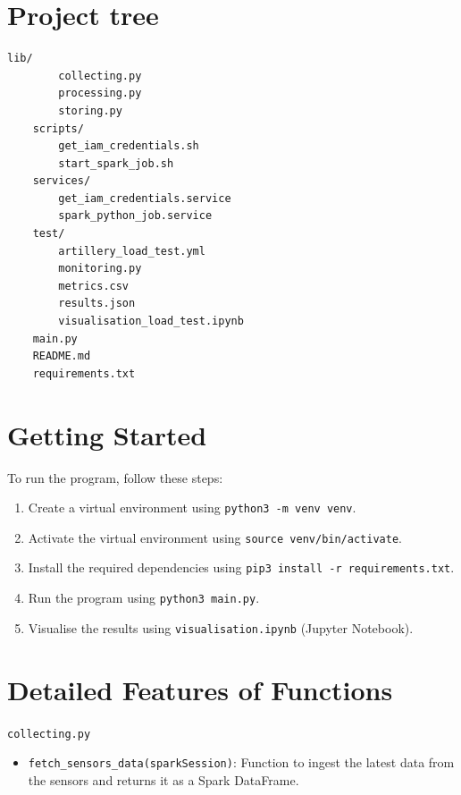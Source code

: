 \documentclass[12pt,oneside]{book} %
\begin{document}
\begin{subappendices}
    \section{Project tree}
    \begin{lstlisting}[breaklines=true, basicstyle=\small]
    lib/
        collecting.py
        processing.py
        storing.py
    scripts/
        get_iam_credentials.sh
        start_spark_job.sh
    services/
        get_iam_credentials.service
        spark_python_job.service
    test/
        artillery_load_test.yml
        monitoring.py
        metrics.csv
        results.json
        visualisation_load_test.ipynb
    main.py
    README.md
    requirements.txt
    \end{lstlisting}

    \section{Getting Started}
    To run the program, follow these steps:
    \begin{enumerate}
        \itemindent=17.87pt
        \item Create a virtual environment using \texttt{python3 -m venv venv}.
        \item Activate the virtual environment using \texttt{source venv/bin/activate}.
        \item Install the required dependencies using \texttt{pip3 install -r
                  requirements.txt}.
        \item Run the program using \texttt{python3 main.py}.
        \item Visualise the results using \texttt{visualisation.ipynb} (Jupyter Notebook).
    \end{enumerate}

    \section{Detailed Features of Functions}
    \begin{description}
        \item \texttt{collecting.py}
              \begin{itemize}
                  \item \texttt{fetch\_sensors\_data(sparkSession)}: Function to ingest the latest data from the sensors and returns it as a Spark DataFrame.
              \end{itemize}


\end{description}
\end{subappendices}
\end{document}
